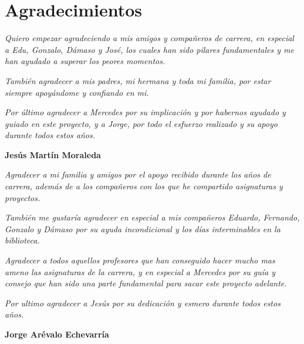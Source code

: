 
\chapter*{Agradecimientos}

\textit{Quiero empezar agradeciendo a mis amigos y compañeros de carrera, en especial a Edu, Gonzalo, Dámaso y José, los cuales han sido pilares fundamentales y me han ayudado a superar los peores momentos.}

\textit{También agradecer a mis padres, mi hermana y toda mi familia, por estar siempre apoyándome y confiando en mi.}

\textit{Por último agradecer a Mercedes por su implicación y por habernos ayudado y guiado en este proyecto, y a Jorge, por todo el esfuerzo realizado y su apoyo durante todos estos años.}

\textbf{Jesús Martín Moraleda}





\textit{Agradecer a mi familia y amigos por el apoyo recibido durante los años de carrera, además de a los compañeros con los que he compartido asignaturas y proyectos.}

\textit{También me gustaría agradecer en especial a mis compañeros Eduardo, Fernando, Gonzalo y Dámaso por su ayuda incondicional y los días interminables en la biblioteca.}

\textit{Agradecer a todos aquellos profesores que han conseguido hacer mucho mas ameno las asignaturas de la carrera, y en especial a Mercedes por su guía y consejo que han sido una parte fundamental para sacar este proyecto adelante.}

\textit{Por ultimo agradecer a Jesús por su dedicación y esmero durante todos estos años.}

\textbf{Jorge Arévalo Echevarría}










